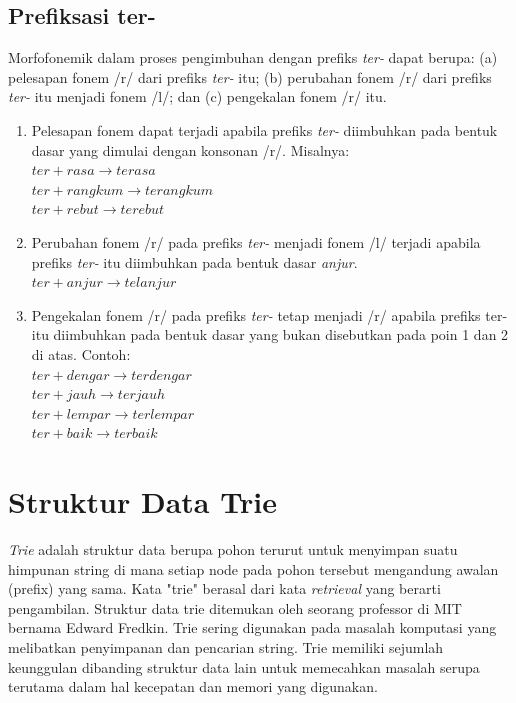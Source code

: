\subsection{Prefiksasi ter-}
\label{sec:prefiksasiTer-}

Morfofonemik dalam proses pengimbuhan dengan prefiks \textit{ter-} dapat berupa: (a) pelesapan fonem /r/ dari prefiks \textit{ter-} itu; (b) perubahan fonem /r/ dari prefiks \textit{ter-} itu menjadi fonem /l/; dan (c) pengekalan fonem /r/ itu. 

\begin{enumerate}
	\item Pelesapan fonem dapat terjadi apabila prefiks \textit{ter-} diimbuhkan pada bentuk dasar yang dimulai dengan konsonan /r/. Misalnya:\\
	$ter + rasa \rightarrow terasa$\\
	$ter + rangkum \rightarrow terangkum$\\
	$ter + rebut \rightarrow terebut$
	
	\item Perubahan fonem /r/ pada prefiks \textit{ter-} menjadi fonem /l/ terjadi apabila prefiks \textit{ter-} itu diimbuhkan pada bentuk dasar \textit{anjur}.\\
	$ter + anjur \rightarrow telanjur$
	
	\item Pengekalan fonem /r/ pada prefiks \textit{ter-} tetap menjadi /r/ apabila prefiks ter- itu diimbuhkan pada bentuk dasar yang bukan disebutkan pada poin 1 dan 2 di atas. Contoh:\\
	$ter + dengar \rightarrow terdengar$\\	
	$ter + jauh \rightarrow terjauh$\\
	$ter + lempar \rightarrow terlempar$\\
	$ter + baik \rightarrow terbaik$
	
\end{enumerate}


\section{Struktur Data Trie}
\label{sec:trie}

\textit{Trie} adalah struktur data berupa pohon terurut untuk menyimpan suatu himpunan string di mana setiap node pada pohon tersebut mengandung awalan (prefix) yang sama\cite{najogie:10:trie}. Kata "trie" berasal dari kata \textit{retrieval} yang berarti pengambilan. Struktur data trie ditemukan oleh seorang professor di MIT bernama Edward Fredkin. Trie sering digunakan pada masalah komputasi yang melibatkan penyimpanan dan pencarian string. Trie memiliki sejumlah keunggulan dibanding struktur data lain untuk memecahkan masalah serupa terutama dalam hal kecepatan dan memori yang digunakan.

